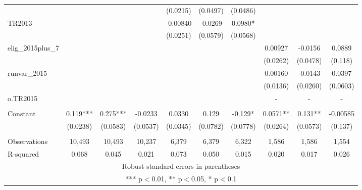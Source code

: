 \documentclass[]{article}
\begin{document}
\begin{tabular}{lccccccccc}
 &  &  &  & (0.0215) & (0.0497) & (0.0486) &  &  &  \\
TR2013 &  &  &  & -0.00840 & -0.0269 & 0.0980* &  &  &  \\
 &  &  &  & (0.0251) & (0.0579) & (0.0568) &  &  &  \\
elig\_2015plus\_7 &  &  &  &  &  &  & 0.00927 & -0.0156 & 0.0889 \\
 &  &  &  &  &  &  & (0.0262) & (0.0478) & (0.118) \\
runvar\_2015 &  &  &  &  &  &  & 0.00160 & -0.0143 & 0.0397 \\
 &  &  &  &  &  &  & (0.0136) & (0.0260) & (0.0603) \\
o.TR2015 &  &  &  &  &  &  & - & - & - \\
 &  &  &  &  &  &  &  &  &  \\
Constant & 0.119*** & 0.275*** & -0.0233 & 0.0330 & 0.129 & -0.129* & 0.0571** & 0.131** & -0.00585 \\
 & (0.0238) & (0.0583) & (0.0537) & (0.0345) & (0.0782) & (0.0778) & (0.0264) & (0.0573) & (0.137) \\
 &  &  &  &  &  &  &  &  &  \\
Observations & 10,493 & 10,493 & 10,237 & 6,379 & 6,379 & 6,322 & 1,586 & 1,586 & 1,554 \\
 R-squared & 0.068 & 0.045 & 0.021 & 0.073 & 0.050 & 0.015 & 0.020 & 0.017 & 0.026 \\ \hline
\multicolumn{10}{c}{ Robust standard errors in parentheses} \\
\multicolumn{10}{c}{ *** p$<$0.01, ** p$<$0.05, * p$<$0.1} \\
\end{tabular}
\end{document}
